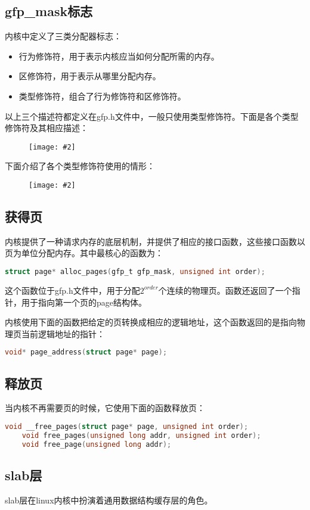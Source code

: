 \documentclass[a4paper,left=2.5cm,right=2.5cm,11pt]{article}
\newcommand{\sizedfic}[2]{\begin{figure}[H]
		\center
		\texttt{[image: \#2]}
	\end{figure}}
\begin{document}
\subsection{gfp\_mask标志}
	内核中定义了三类分配器标志：
	\begin{itemize}
		\item 行为修饰符，用于表示内核应当如何分配所需的内存。
		\item 区修饰符，用于表示从哪里分配内存。
		\item 类型修饰符，组合了行为修饰符和区修饰符。
	\end{itemize}

	以上三个描述符都定义在gfp.h文件中，一般只使用类型修饰符。下面是各个类型修饰符及其相应描述：
	\sizedfic{1}{9.png}
	
	下面介绍了各个类型修饰符使用的情形：
	\sizedfic{1}{10.png}

\subsection{获得页}
	内核提供了一种请求内存的底层机制，并提供了相应的接口函数，这些接口函数以页为单位分配内存。其中最核心的函数为：
	\begin{lstlisting}[language = C]
	struct page* alloc_pages(gfp_t gfp_mask, unsigned int order);
	\end{lstlisting}

	这个函数位于gfp.h文件中，用于分配$2^{order}$个连续的物理页。函数还返回了一个指针，用于指向第一个页的page结构体。\par
	内核使用下面的函数把给定的页转换成相应的逻辑地址，这个函数返回的是指向物理页当前逻辑地址的指针：
	\begin{lstlisting}[language = C]
	void* page_address(struct page* page);
	\end{lstlisting}


\subsection{释放页}
	当内核不再需要页的时候，它使用下面的函数释放页：
	\begin{lstlisting}[language = C]
	void __free_pages(struct page* page, unsigned int order);
	void free_pages(unsigned long addr, unsigned int order);
	void free_page(unsigned long addr);
	\end{lstlisting}

\subsection{slab层}
	slab层在linux内核中扮演着通用数据结构缓存层的角色。
\end{document}
